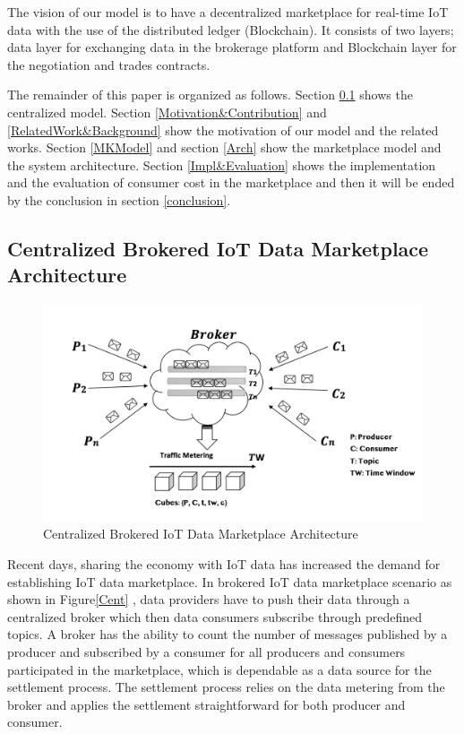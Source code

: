 \documentclass[letterpaper, 10 pt, conference]{ieeeconf}  %
\begin{document}
The vision of our model is to have a decentralized marketplace for real-time IoT data with the use of the distributed ledger (Blockchain). It consists of two layers; data layer for exchanging data in the brokerage platform and Blockchain layer for the negotiation and trades contracts.

The remainder of this paper is organized as follows. Section \ref{CentModel} shows the centralized model. Section \ref{Motivation&Contribution} and \ref{RelatedWork&Background} show the motivation of our model and the related works. Section \ref{MKModel} and section \ref{Arch} show the marketplace model and the system architecture. Section \ref{Impl&Evaluation} shows the implementation and the evaluation of  consumer cost in the marketplace and then it will be ended by the conclusion in section \ref{conclusion}.

\subsection{Centralized Brokered IoT Data Marketplace Architecture} \label{CentModel}

\begin{figure}
  \caption{Centralized Brokered IoT Data Marketplace Architecture}
  \label{fig:brokered-data-exchange}
  \includegraphics[scale=0.4]{Cent}

\end{figure}

Recent days, sharing the economy with IoT data has increased the demand for establishing IoT data marketplace. In brokered IoT data marketplace scenario as shown in Figure\ref{Cent} , data providers have to push their data through a centralized broker which then data consumers subscribe through predefined topics. A broker has the ability to count the number of messages published by a producer and subscribed by a consumer for all producers and consumers participated in the marketplace, which is dependable as a data source for the settlement process. The settlement process relies on the data metering from the broker and applies the settlement straightforward for both producer and consumer. 
	
\end{document}

